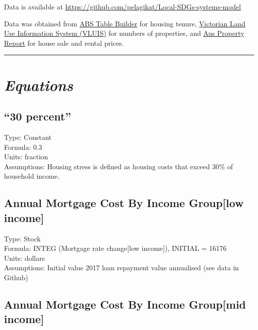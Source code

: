 \documentclass[
  11pt,
]{book}
\begin{document}
Data is available at \url{https://github.com/pelagikat/Local-SDGs-systems-model}

Data was obtained from \href{https://www.abs.gov.au/websitedbs/censushome.nsf/home/tablebuilder}{ABS Table Builder} for housing tenure, \href{http://vro.agriculture.vic.gov.au/dpi/vro/vrosite.nsf/pages/vluis}{Victorian Land Use Information System (VLUIS)} for numbers of properties, and \href{https://www.aupropertyreport.com/suburb-report/forrest-3236-vic/}{Aus Property Report} for house sale and rental prices.

\begin{center}\rule{0.5\linewidth}{0.5pt}\end{center}

\hypertarget{equations-2}{%
\section{\texorpdfstring{\emph{Equations}}{Equations}}\label{equations-2}}

\hypertarget{percent}{%
\subsection{``30 percent''}\label{percent}}

Type: Constant\\
Formula: 0.3\\
Units: fraction\\
Assumptions: Housing stress is defined as housing costs that exceed 30\% of household income.

\hypertarget{annual-mortgage-cost-by-income-grouplow-income}{%
\subsection{Annual Mortgage Cost By Income Group{[}low income{]}}\label{annual-mortgage-cost-by-income-grouplow-income}}

Type: Stock\\
Formula: INTEG (Mortgage rate change{[}low income{]}), INITIAL = 16176\\
Units: dollars\\
Assumptions: Initial value 2017 loan repayment value annualised (see data in Github)

\hypertarget{annual-mortgage-cost-by-income-groupmid-income}{%
\subsection{Annual Mortgage Cost By Income Group{[}mid income{]}}\label{annual-mortgage-cost-by-income-groupmid-income}}
\end{document}
